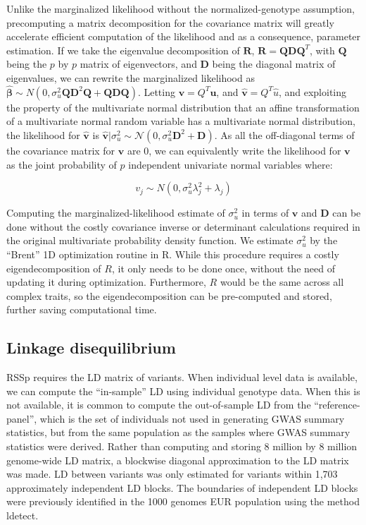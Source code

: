 Unlike the marginalized likelihood without the normalized-genotype assumption,
precomputing a matrix decomposition for the covariance matrix will greatly
accelerate efficient computation of the likelihood
and as a consequence, parameter estimation.
If we take the eigenvalue decomposition of $\textbf{R}$, $\textbf{R}=\textbf{Q}\textbf{D}\textbf{Q}^T$, with $\textbf{Q}$ 
being the $p$ by $p$ matrix of
eigenvectors, and $\textbf{D}$ being the diagonal matrix of eigenvalues, we can rewrite the marginalized likelihood as
$\hat{\boldsymbol{\beta}} \sim N(0,\sigma_u^2\textbf{QD}^2\textbf{Q}+\textbf{QDQ})$.  Letting $\textbf{v} = Q^T \textbf{u}$, and 
$\hat{\textbf{v}} = Q^{T}\hat{u}$, and exploiting the property of
the multivariate normal distribution that an affine transformation of a multivariate normal random variable has a multivariate normal distribution, the
likelihood for $\hat{\textbf{v}}$ is $\hat{\textbf{v}}|\sigma_u^2 \sim \mathcal{N}(0,\sigma_u^2\textbf{D}^{2}+\textbf{D})$.  As all the off-diagonal terms of
the covariance matrix for ${\textbf{v}}$ are $0$, we can equivalently write the likelihood for ${\textbf{v}}$ as the joint probability of $p$ independent
univariate normal variables where:

\[ v_j \sim N(0,\sigma^2_u\lambda_j^2+\lambda_j) \]

Computing the marginalized-likelihood estimate of $\sigma^2_u$ in terms of $\textbf{v}$ and $\textbf{D}$ can be done without the costly covariance inverse or determinant calculations required in the original multivariate probability density function.  We estimate $\sigma^2_u$ by the ``Brent'' 1D optimization routine in R\cite{brent1972algorithms}. While this procedure requires a costly eigendecomposition of $R$, it only needs to be done once, without the need of updating it during optimization. Furthermore, $R$ would be the same across all complex traits, so the eigendecomposition can be pre-computed and stored, further saving computational time. 


\subsection{Linkage disequilibrium}\label{sec:org828aaeb}

RSSp requires the LD matrix of variants. When individual level data is available, we can compute the ``in-sample'' LD using individual genotype data. When this is not available, it is common to compute the out-of-sample LD from the ``reference-panel'', which is the set of individuals not used in generating GWAS summary statistics, but from the same population as the samples where GWAS summary statistics were derived. Rather than computing and storing 8 million by 8 million genome-wide LD matrix, a blockwise diagonal approximation to the LD matrix was made.  LD between variants was only estimated for variants within 1,703 approximately independent LD blocks.  The boundaries of independent LD blocks were previously identified in the 1000 genomes EUR population using the method ldetect\cite{ldetect}.  

